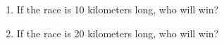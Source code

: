 \documentclass{ximera}
\begin{document}
\begin{exercise}
\begin{enumerate}
\item If the race is 10 kilometers long, who will win?
\begin{multipleChoice}
\end{multipleChoice}

\item If the race is 20 kilometers long, who will win?
\begin{multipleChoice}
\end{multipleChoice}



	
\end{enumerate}

\end{exercise}
\end{document}
